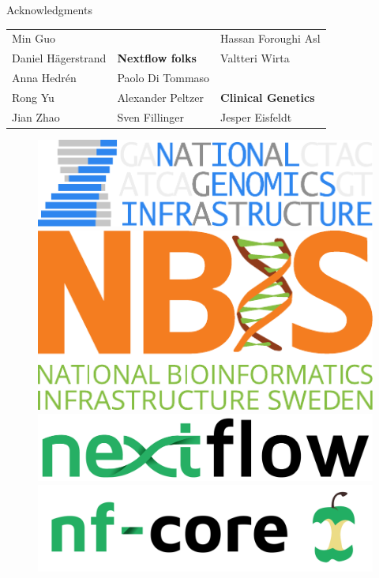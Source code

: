 \documentclass[usepdftitle=false]{beamer}
\begin{document}
\begin{frame}{Acknowledgments}
\begin{table}
{\begin{tabular}{lll}
		Min Guo											&															&	Hassan Foroughi Asl				\\
		Daniel Hägerstrand					&	\textbf{Nextflow folks}			&	Valtteri Wirta						\\
		Anna Hedrén									&	Paolo Di Tommaso						&														\\
		Rong Yu											&	Alexander Peltzer						&	\textbf{Clinical Genetics}\\
		Jian Zhao										&	Sven Fillinger							&	Jesper Eisfeldt						\\
		\end{tabular}}
	\end{table}
	\begin{figure}
		\includegraphics[height=.6cm]{pictures/NGI}%
		\hfill%
		\includegraphics[height=.6cm]{pictures/NBIS}%
		\hfill%
		\includegraphics[height=.6cm]{pictures/nextflow.png}%
		\hfill%
		\includegraphics[height=.6cm]{pictures/nf-core-logo}%
	\end{figure}
\end{frame}
\end{document}
